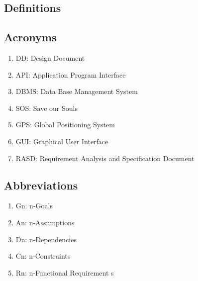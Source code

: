 \subsection{Definitions}


\subsection{Acronyms}
\begin{enumerate}
\item DD: Design Document
\item API: Application Program Interface
\item DBMS: Data Base Management System
\item SOS: Save our Souls
\item GPS: Global Positioning System
\item GUI: Graphical User Interface
\item RASD: Requirement Analysis and Specification Document
\end{enumerate}

\subsection{Abbreviations}
\begin{enumerate}
\item Gn: n-Goals
\item An: n-Assumptions
\item Dn: n-Dependencies
\item Cn: n-Constraints
\item Rn: n-Functional Requirement s
\end{enumerate}
